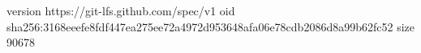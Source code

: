 version https://git-lfs.github.com/spec/v1
oid sha256:3168eeefe8fdf447ea275ee72a4972d953648afa06e78cdb2086d8a99b62fc52
size 90678
